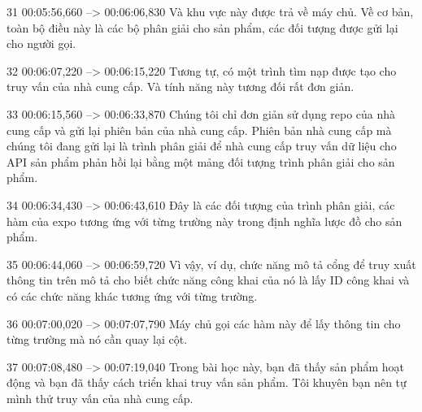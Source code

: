 31
00:05:56,660 --> 00:06:06,830
Và khu vực này được trả về máy chủ.  Về cơ bản, toàn bộ điều này là các bộ phân giải cho sản phẩm, các đối tượng được gửi lại cho người gọi.

32
00:06:07,220 --> 00:06:15,220
Tương tự, có một trình tìm nạp được tạo cho truy vấn của nhà cung cấp.  Và tính năng này tương đối rất đơn giản.

33
00:06:15,560 --> 00:06:33,870
Chúng tôi chỉ đơn giản sử dụng repo của nhà cung cấp và gửi lại phiên bản của nhà cung cấp.  Phiên bản nhà cung cấp mà chúng tôi đang gửi lại là trình phân giải để nhà cung cấp truy vấn dữ liệu cho API sản phẩm phản hồi lại bằng một mảng đối tượng trình phân giải cho sản phẩm.

34
00:06:34,430 --> 00:06:43,610
Đây là các đối tượng của trình phân giải, các hàm của expo tương ứng với từng trường này trong định nghĩa lược đồ cho sản phẩm.

35
00:06:44,060 --> 00:06:59,720
Vì vậy, ví dụ, chức năng mô tả cổng để truy xuất thông tin trên mô tả cho biết chức năng công khai của nó là lấy ID công khai và có các chức năng khác tương ứng với từng trường.

36
00:07:00,020 --> 00:07:07,790
Máy chủ gọi các hàm này để lấy thông tin cho từng trường mà nó cần quay lại cột.

37
00:07:08,480 --> 00:07:19,040
Trong bài học này, bạn đã thấy sản phẩm hoạt động và bạn đã thấy cách triển khai truy vấn sản phẩm.  Tôi khuyên bạn nên tự mình thử truy vấn của nhà cung cấp.

